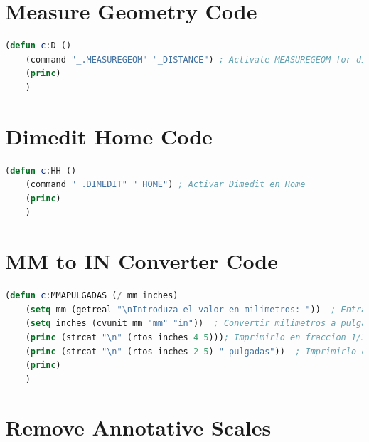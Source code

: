 \documentclass[12pt,letterpaper,final]{report}
\begin{document}
\chapter{Measure Geometry Code}


\begin{lstlisting}[language=Lisp]
	(defun c:D ()
	(command "_.MEASUREGEOM" "_DISTANCE") ; Activate MEASUREGEOM for distance
	(princ)
	)
\end{lstlisting}

\chapter{Dimedit Home Code}

\begin{lstlisting}[language=Lisp]
	(defun c:HH ()
	(command "_.DIMEDIT" "_HOME") ; Activar Dimedit en Home
	(princ)
	)
\end{lstlisting}

\chapter{MM to IN Converter Code}
\begin{lstlisting}[language=Lisp]
	(defun c:MMAPULGADAS (/ mm inches)
	(setq mm (getreal "\nIntroduza el valor en milimetros: "))  ; Entrada en milimetros
	(setq inches (cvunit mm "mm" "in"))  ; Convertir milimetros a pulgadas
	(princ (strcat "\n" (rtos inches 4 5))); Imprimirlo en fraccion 1/32 mas cercana
	(princ (strcat "\n" (rtos inches 2 5) " pulgadas"))  ; Imprimirlo con 5 decimales
	(princ)
	)
\end{lstlisting}

\chapter{Remove Annotative Scales}
\end{document}

